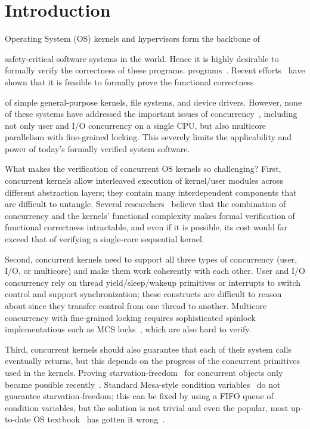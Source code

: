 \section{Introduction}
\label{sec:intro}

Operating System (OS) kernels and hypervisors form the backbone of
safety-critical software systems in the world.  Hence it is
highly desirable to formally verify the correctness of these
\ifanonymized programs.  \else programs~\cite{shao10}.  \fi Recent
efforts~\cite{klein2009sel4,hawblitzel10,klein14,ironclad14,dscal15,fscq15,cogent16,chen16}
have shown that it is feasible to formally prove the functional
correctness of simple general-purpose kernels, file systems,
and device drivers. However, none of these systems have addressed the
important issues of concurrency~\cite{kaashoek15,ospp11}, 
including not only user and I/O concurrency on a single CPU, but also
multicore parallelism with fine-grained locking. This severely limits
the applicability and power of today's formally verified system
software.

What makes the verification of concurrent OS kernels so challenging?
First, concurrent kernels allow interleaved execution of kernel/user
modules across different abstraction layers; they contain many
interdependent components that are difficult to untangle.  Several
researchers~\cite{vontessin13,peters15} believe that the combination
of concurrency and the kernels' functional complexity makes formal
verification of functional correctness intractable, and even if it is
possible, its cost would far exceed that of verifying a single-core
sequential kernel.

Second, concurrent kernels need to support all three types of
concurrency (user, I/O, or multicore) and make them work coherently
with each other. User and I/O concurrency rely on thread
yield/sleep/wakeup primitives or interrupts to switch control and
support synchronization; these constructs are difficult to reason
about since they transfer control from one thread to another.
Multicore concurrency with fine-grained locking requires sophisticated
spinlock implementations such as MCS locks~\cite{mcs91}, which are also
hard to verify.

Third, concurrent kernels should also guarantee that each of their
system calls eventually returns, but this depends on the progress of
the concurrent primitives used in the kernels. Proving
starvation-freedom~\cite{Herlihy08book} for concurrent objects only
became possible recently~\cite{lili16}.  Standard Mesa-style condition
variables~\cite{lampson80} do not guarantee starvation-freedom; this
can be fixed by using a FIFO queue of condition variables, but the
solution is not trivial and even the popular, most up-to-date OS
textbook~\cite[Fig.~5.14]{ospp11} has gotten it
wrong~\cite{anderson16}.

